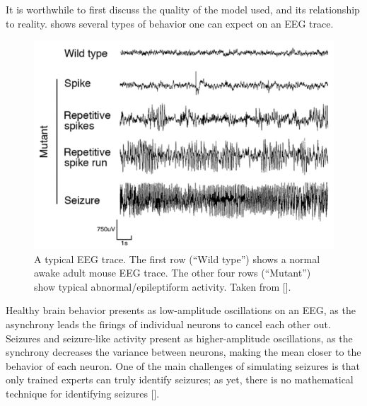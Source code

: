 It is worthwhile to first discuss the quality of the model used, and its relationship to reality.
 shows several types of behavior one can expect on an EEG trace.
\begin{figure}[ht]
  \centering
  \includegraphics[width=\columnwidth]{figure/eeg.pdf}
  \caption[Typical EEG trace]{A typical EEG trace.
    The first row (``Wild type'') shows a normal awake adult mouse EEG trace.
    The other four rows (``Mutant'') show typical abnormal/epileptiform activity.
    Taken from [].
  }
  \label{fig:eeg}
\end{figure}
Healthy brain behavior presents as low-amplitude oscillations on an EEG, as the asynchrony leads the firings of individual neurons to cancel each other out.
Seizures and seizure-like activity present as higher-amplitude oscillations, as the synchrony decreases the variance between neurons, making the mean closer to the behavior of each neuron.
One of the main challenges of simulating seizures is that only trained experts can truly identify seizures; as yet, there is no mathematical technique for identifying seizures [].

